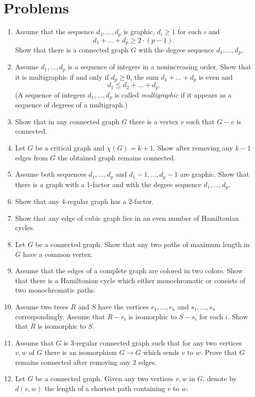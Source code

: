\chapter{Problems}


\begin{enumerate}
\item Assume that the sequence $d_1,\dots, d_p$ is graphic,
$d_i\ge 1$ for each $i$ and 
\[d_1+\dots+d_p\ge 2\cdot(p-1).\]
Show that there is a connected graph $G$ with the degree sequence $d_1,\dots, d_p$.
\item Assume $d_1,\dots, d_p$ is a sequence of integers in a nonincreasing order.
Show that it is multigraphic if and only if $d_p\ge0$, the sum $d_1+\dots+ d_p$ is even and 
\[d_1\le d_2+\dots+d_p.\]
(A sequence of integers $d_1,\dots, d_p$ is called \textit{multigraphic} if it appears as a sequence of degrees of a multigraph.)
\item Show that in any connected graph $G$ there is a vertex $v$ such that $G-v$ is connected.
\item Let $G$ be a critical graph and $\chi(G)=k+1$.
Show after removing any $k-1$ edges from $G$  
the obtained graph remains connected. 
\item Assume both sequences $d_1,\dots, d_p$
 and $d_1-1,\dots, d_p-1$ are graphic.
Show that there is a graph with a 1-factor and with the degree sequence $d_1,\dots, d_p$.
\item Show that any $4$-regular graph has a $2$-factor.
\item Show that any edge of cubic graph lies in an even number of Hamiltonian cycles.
\item Let $G$ be a  connected graph.
Show that any two paths of maximum length in $G$ have a common vertex.
\item Assume that the edges of a complete graph are colored in two colors.
Show that there is a Hamiltonian cycle which either monochromatic or consists of two monochromatic paths.
\item Assume two trees $R$ and $S$ 
have the vertices $r_1,\dots,r_n$ and $s_1,\dots,s_n$ correspondingly.
Assume that $R-r_i$ is isomorphic to $S-s_i$ for each $i$.
Show that $R$ is isomorphic to $S$.
\item Assume that $G$ is $3$-regular connected graph such that 
for any two vertices $v,w$ of $G$ there is an isomorphism
$G\to G$ which sends $v$ to $w$.
Prove that $G$ remains connected after removing any $2$ edges.
\item  Let $G$ be a connected graph.
Given any two vertices $v,w$ in $G$, denote by $d(v,w)$ the length of a shortest path containing $v$ to $w$. 


\end{enumerate}
